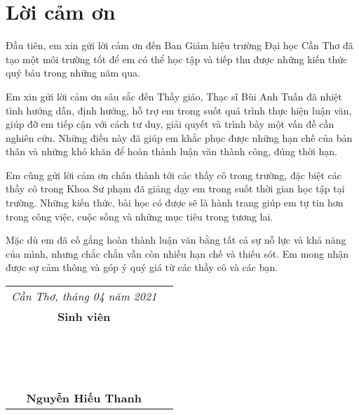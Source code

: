 \chapter*{Lời cảm ơn}

Đầu tiên, em xin gửi lời cảm ơn đến Ban Giám hiệu trường Đại học Cần Thơ đã tạo một môi trường tốt để em có thể học tập và tiếp thu được những kiến thức quý báu trong những năm qua.\par
Em xin gửi lời cảm ơn sâu sắc đến Thầy giáo, Thạc sĩ Bùi Anh Tuấn đã nhiệt tình hướng dẫn, định hướng, hỗ trợ em trong suốt quá trình thực hiện luận văn, giúp đỡ em tiếp cận với cách tư duy, giải quyết và trình bày một vấn đề cần nghiên cứu. Những điều này đã giúp em khắc phục được những hạn chế của bản thân và những khó khăn để hoàn thành luận văn thành công, đúng thời hạn.\par
Em cũng gửi lời cảm ơn chân thành tới các thầy cô trong trường, đặc biệt các thầy cô trong Khoa Sư phạm đã giảng dạy em trong suốt thời gian học tập tại trường. Những kiến thức, bài học có được sẽ là hành trang giúp em tự tin hơn trong công việc, cuộc sống và những mục tiêu trong tương lai.\par
Mặc dù em đã cố gắng hoàn thành luận văn bằng tất cả sự nỗ lực và khả năng của mình, nhưng chắc chắn vẫn còn nhiều hạn chế và thiếu sót. Em mong nhận được sự cảm thông và góp ý quý giá từ các thầy cô và các bạn.\par

\begin{flushright}
\begin{tabular}{Sc}
	\textit{Cần Thơ, tháng 04 năm 2021}\\
	\textbf{Sinh viên}\\~\\~\\~\\
	\textbf{Nguyễn Hiếu Thanh}\\
\end{tabular}
\end{flushright}\par
